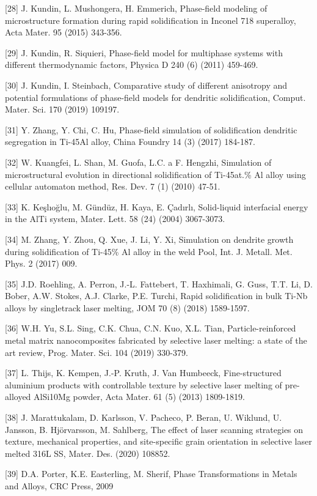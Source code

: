 \documentclass[10pt]{article}
\begin{document}
[28] J. Kundin, L. Mushongera, H. Emmerich, Phase-field modeling of microstructure formation during rapid solidification in Inconel 718 superalloy, Acta Mater. 95 (2015) 343-356.

[29] J. Kundin, R. Siquieri, Phase-field model for multiphase systems with different thermodynamic factors, Physica D 240 (6) (2011) 459-469.

[30] J. Kundin, I. Steinbach, Comparative study of different anisotropy and potential formulations of phase-field models for dendritic solidification, Comput. Mater. Sci. 170 (2019) 109197.

[31] Y. Zhang, Y. Chi, C. Hu, Phase-field simulation of solidification dendritic segregation in Ti-45Al alloy, China Foundry 14 (3) (2017) 184-187.

[32] W. Kuangfei, L. Shan, M. Guofa, L.C. a F. Hengzhi, Simulation of microstructural evolution in directional solidification of Ti-45at.\% Al alloy using cellular automaton method, Res. Dev. 7 (1) (2010) 47-51.

[33] K. Keşlıoğlu, M. Gündüz, H. Kaya, E. Çadırlı, Solid-liquid interfacial energy in the AlTi system, Mater. Lett. 58 (24) (2004) 3067-3073.

[34] M. Zhang, Y. Zhou, Q. Xue, J. Li, Y. Xi, Simulation on dendrite growth during solidification of Ti-45\% Al alloy in the weld Pool, Int. J. Metall. Met. Phys. 2 (2017) 009.

[35] J.D. Roehling, A. Perron, J.-L. Fattebert, T. Haxhimali, G. Guss, T.T. Li, D. Bober, A.W. Stokes, A.J. Clarke, P.E. Turchi, Rapid solidification in bulk Ti-Nb alloys by singletrack laser melting, JOM 70 (8) (2018) 1589-1597.

[36] W.H. Yu, S.L. Sing, C.K. Chua, C.N. Kuo, X.L. Tian, Particle-reinforced metal matrix nanocomposites fabricated by selective laser melting: a state of the art review, Prog. Mater. Sci. 104 (2019) 330-379.

[37] L. Thijs, K. Kempen, J.-P. Kruth, J. Van Humbeeck, Fine-structured aluminium products with controllable texture by selective laser melting of pre-alloyed AlSi10Mg powder, Acta Mater. 61 (5) (2013) 1809-1819.

[38] J. Marattukalam, D. Karlsson, V. Pacheco, P. Beran, U. Wiklund, U. Jansson, B. Hjörvarsson, M. Sahlberg, The effect of laser scanning strategies on texture, mechanical properties, and site-specific grain orientation in selective laser melted 316L SS, Mater. Des. (2020) 108852.

[39] D.A. Porter, K.E. Easterling, M. Sherif, Phase Transformations in Metals and Alloys, CRC Press, 2009
\end{document}
